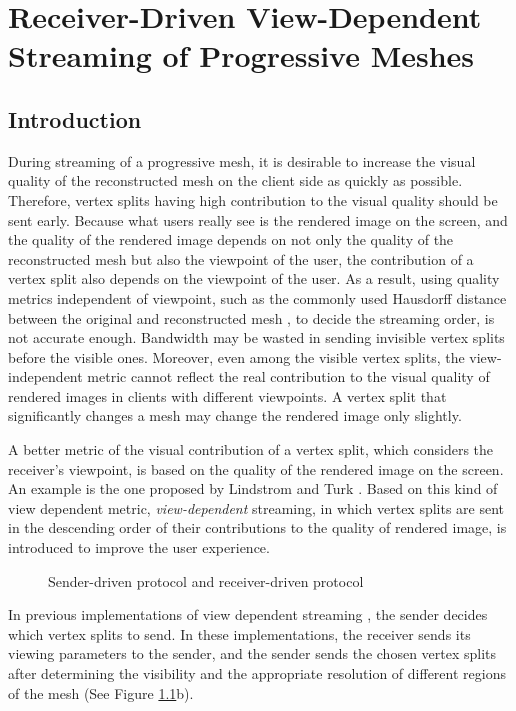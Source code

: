 \chapter{Receiver-Driven View-Dependent Streaming of Progressive Meshes}
\label{c:rdstream}
\section{Introduction}
\label{s:dstream:intro}
    During streaming of a progressive mesh, it is desirable to 
    increase the visual quality of the reconstructed mesh on the client side
    as quickly as possible. 
    Therefore, vertex splits having high contribution to the visual quality
    should be sent early. 
    Because what users really see is the rendered image on the screen,
    and the quality of the rendered image depends on not only the quality of the reconstructed
    mesh but also the viewpoint of the user,  the contribution of a vertex split 
    also depends on the viewpoint of the user. 
    As a result, using quality metrics independent of viewpoint,
    such as the commonly used Hausdorff distance between the 
    original and reconstructed mesh \cite{cignoni98metro}, to
    decide the streaming order, is not accurate enough. 
    Bandwidth may be wasted in sending invisible vertex splits
    before the visible ones. Moreover, even among the visible vertex splits,
    the view-independent metric cannot reflect the real contribution to
    the visual quality of rendered images in clients with different viewpoints. 
    A vertex split that significantly changes a mesh may change the rendered image 
    only slightly.

    A better metric of the visual contribution of a vertex split, 
    which considers the receiver's viewpoint, is 
    based on the quality of the rendered image on the screen.
    An example is the one proposed by Lindstrom and Turk \cite{353995}.
    Based on this kind of view dependent metric, \emph{view-dependent} streaming,
    in which vertex splits are sent in the descending order of 
    their contributions to the quality of rendered image, is introduced
    to improve the user experience. 
    
    \begin{figure}
    \centering
    \caption{Sender-driven protocol and receiver-driven protocol 
    \label{dstream:protocol}}
    \end{figure}
    In previous implementations of view dependent streaming
    \cite{To1999, 363375, progressive:Yang, kim:view, zheng:interactive}, 
    the sender decides which vertex splits to send. In these implementations,  
    the receiver sends its viewing parameters to the sender, 
    and the sender sends the chosen vertex splits after
    determining the visibility and the appropriate resolution of 
    different regions of the mesh (See Figure \ref{dstream:protocol}b).

